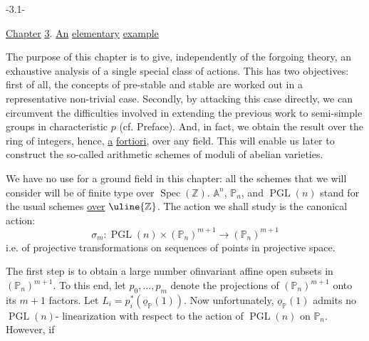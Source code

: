 \begin{center}-3.1-\end{center}
\uline{Chapter} \uline{3}. \uline{An} \uline{elementary} \uline{example}

The purpose of this chapter is to give, independently of the
forgoing theory, an exhaustive analysis of a single special class of
actions. This has two objectives: first of all, the concepts of
pre-stable and stable are worked out in a representative non-trivial
case. Secondly, by attacking this case directly, we can circumvent
the difficulties involved in extending the previous work to semi-simple
groups in characteristic $p$ (cf. Preface). And, in fact, we obtain the
result over the ring of integers, hence, \uline{a} \uline{fortiori}, over any field.
This will enable us later to construct the so-called arithmetic
schemes of moduli of abelian varieties.

We have no use for a ground field in this chapter: all the
schemes that we will consider will be of finite type over $\operatorname{Spec}(\mathbb Z)$.
$\mathbb A^n$, $\mathbb P_n$, and $\operatorname{PGL}(n)$ stand for the usual schemes \uline{over} $\uline{\mathbb Z}$. The
action we shall study is the canonical action:
\[
\sigma_m:\operatorname{PGL}(n)\times(\mathbb P_n)^{m+1}\longrightarrow(\mathbb P_n)^{m+1}
\]
\margin{$-$}
i.e. of projective transformations on sequences of points in projective
space.

 The first step is to obtain a large number of\inserted{\ }invariant affine
open subsets in $(\mathbb P_n)^{m+1}$. To this end, let $p_0,\ldots,p_m$ denote
the projections of $(\mathbb P_n)^{m+1}$ onto its $m+1$ factors. Let
$L_i=p_i^*(\underline{o}_{\mathbb P}(1))$. Now unfortunately, $\underline{o}_{\mathbb P}(1)$ admits no $\operatorname{PGL}(n)$-
linearization with respect to the action of $\operatorname{PGL}(n)$ on $\mathbb P_n$. However, if
